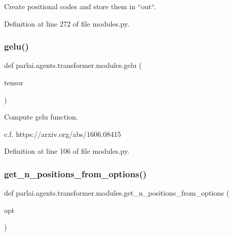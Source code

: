 \begin{DoxyVerb}Create positional codes and store them in ``out``.\end{DoxyVerb}
 

Definition at line 272 of file modules.\+py.

\mbox{\label{namespaceparlai_1_1agents_1_1transformer_1_1modules_ad93916b8d2188c35733089e1581c44f8}} 
\subsubsection{\texorpdfstring{gelu()}{gelu()}}
{\footnotesize\ttfamily def parlai.\+agents.\+transformer.\+modules.\+gelu (\begin{DoxyParamCaption}\item[{}]{tensor }\end{DoxyParamCaption})}

\begin{DoxyVerb}Compute gelu function.

c.f. https://arxiv.org/abs/1606.08415
\end{DoxyVerb}
 

Definition at line 106 of file modules.\+py.

\mbox{\label{namespaceparlai_1_1agents_1_1transformer_1_1modules_ab67607512c597ddd54f2b60a1a1eaf4c}} 
\subsubsection{\texorpdfstring{get\+\_\+n\+\_\+positions\+\_\+from\+\_\+options()}{get\_n\_positions\_from\_options()}}
{\footnotesize\ttfamily def parlai.\+agents.\+transformer.\+modules.\+get\+\_\+n\+\_\+positions\+\_\+from\+\_\+options (\begin{DoxyParamCaption}\item[{}]{opt }\end{DoxyParamCaption})}

